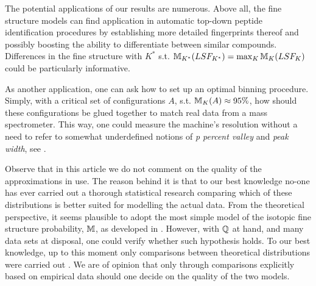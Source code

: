 	The potential applications of our results are numerous. Above all, the fine structure models can find application in automatic top-down peptide identification procedures by establishing more detailed fingerprints thereof and possibly boosting the ability to differentiate between similar compounds. Differences in the fine structure with $K^*$ s.t. $\mathbb{M}_{K^*}(LSF_{K^*}) = \max_K \mathbb{M}_K(LSF_K)$ could be particularly informative.


	As another application, one can ask how to set up an optimal binning procedure. Simply, with a critical set of configurations $A$, s.t. $\mathbb{M}_K(A) \approx 95\%$, how should these configurations be glued together to match real data from a mass spectrometer. This way, one could measure the machine's resolution without a need to refer to somewhat underdefined notions of {\it p percent valley} and {\it peak width}, see \cite{Eidhammer2008ComputationalMethodsInMassSpectrometry}. 


	Observe that in this article we do not comment on the quality of the approximations in use. The reason behind it is that to our best knowledge no-one has ever carried out a thorough statistical research comparing which of these distributions is better suited for modelling the actual data. From the theoretical perspective, it seems plausible to adopt the most simple model of the isotopic fine structure probability, $\mathbb{M}$, as developed in \cite{Kienitz1961MassSpectrometry}. However, with $\mathbb{Q}$ at hand, and many data sets at disposal, one could verify whether such hypothesis holds. To our best knowledge, up to this moment only comparisons between theoretical distributions were carried out \cite{Valkenborg2007UsingPoisson}. We are of opinion that only through comparisons explicitly based on empirical data should one decide on the quality of the two models.






